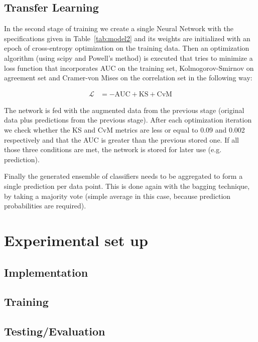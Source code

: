 \documentclass[conference]{IEEEtran}
\begin{document}
\subsection{Transfer Learning}
In the second stage of training we create a single Neural Network with the
specifications given in Table~\ref{tab:model2} and its weights are initialized
with an epoch of cross-entropy optimization on the training data. Then an
optimization algorithm (using scipy and Powell's method) is executed that tries
to minimize a loss function that incorporates AUC on the training set,
Kolmogorov-Smirnov on agreement set and Cramer-von Mises on the correlation set
in the following way:

\begin{align}
	\mathcal{L} &= -\text{AUC} + \text{KS} + \text{CvM}
	\label{eqn:loss}
\end{align}

The network is fed with the augmented data from the previous stage (original
data plus predictions from the previous stage).  After each optimization
iteration we check whether the KS and CvM metrics are less or equal to 0.09 and
0.002 respectively and that the AUC is greater than the previous stored one. If
all those three conditions are met, the network is stored for later use (e.g.
prediction).

Finally the generated ensemble of classifiers needs to be aggregated to form a
single prediction per data point. This is done again with the bagging technique,
by taking a majority vote (simple average in this case, because prediction
probabilities are required).

\section{Experimental set up}
\label{sec:experiment}

\subsection{Implementation}
\label{sec:implementation}


\subsection{Training}


\subsection{Testing/Evaluation}
\end{document}
